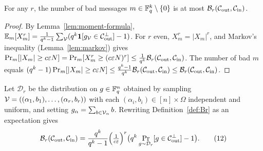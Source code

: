 \begin{lemma}
  \label{obs:bad-count}
  For any $r$, the number of bad messages $m \in \mathbb{F}_q^k\setminus\{0\}$ is at most
  $\mathcal{B}_r(\mathcal{C}_{\mathrm{out}},\mathcal{C}_{\mathrm{in}})$.
\end{lemma}
\begin{proof}
  By Lemma~\ref{lem:moment-formula}, $\mathbb{E}_{m}[X_m^r] = \frac{1}{q^k-1}
  \sum_{\mathcal{V}}(q^k\mathbf{1}[g_{\mathcal{V}}\in\mathcal{C}_{\mathrm{out}}^\perp]-1)$. For $r$ even,
  $X_m^r = |X_m|^r$, and Markov's inequality (Lemma~\ref{lem:markov}) gives
  $\Pr_m[|X_m|\geq c\varepsilon N] = \Pr_m[X_m^r \geq (c\varepsilon N)^r]\leq
  \frac{1}{q^k}\mathcal{B}_r(\mathcal{C}_{\mathrm{out}},\mathcal{C}_{\mathrm{in}})$. The number of bad $m$ equals
  $(q^k-1)\Pr_m[|X_m|\geq c\varepsilon N]\leq \frac{q^k-1}{q^k}
  \mathcal{B}_r(\mathcal{C}_{\mathrm{out}},\mathcal{C}_{\mathrm{in}})\leq \mathcal{B}_r(\mathcal{C}_{\mathrm{out}},\mathcal{C}_{\mathrm{in}})$.
\end{proof}

\begin{definition}
  \label{def:Dr}
  Let $\mathcal{D}_r$ be the distribution on $g \in \mathbb{F}_q^n$ obtained by sampling
  $\mathcal{V} = ((\alpha_1,b_1),\dots,(\alpha_r,b_r))$ with each $(\alpha_i,b_i) \in
  [n]\times\Omega$ independent and uniform, and setting
  $g_\alpha = \sum_{b \in \mathcal{V}_\alpha} b$. Rewriting
  Definition~\ref{def:Br} as an expectation gives
  \begin{equation}
    \mathcal{B}_r(\mathcal{C}_{\mathrm{out}},\mathcal{C}_{\mathrm{in}}) = \frac{q^k}{q^k-1}\Big(\tfrac{1}{c\varepsilon}\Big)^r
      \big(q^k\Pr_{g\sim\mathcal{D}_r}[g\in\mathcal{C}_{\mathrm{out}}^\perp]-1\big).
    \tag{12}
  \end{equation}
\end{definition}

